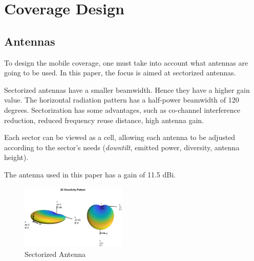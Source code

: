 \documentclass[letterpaper, 10 pt, conference]{ieeeconf}  %
\begin{document}
\section{Coverage Design}
\subsection{Antennas}\noindent
To design the mobile coverage, one must take into account what antennas are going to be used. In this paper, the focus is aimed at sectorized antennas.
\par\noindent
Sectorized antennas have a smaller beamwidth. Hence they have a higher gain value. The horizontal radiation pattern has a half-power beamwidth of 120 degrees. Sectorization has some advantages, such as co-channel interference reduction, reduced frequency reuse distance, high antenna gain. \par\noindent
Each sector can be viewed as a cell, allowing each antenna to be adjusted according to the sector's needs (\textit{downtilt}, emitted power, diversity, antenna height).\par\noindent
The antenna used in this paper has a gain of 11.5 dBi.
\begin{figure}[h]
    \centering
    \includegraphics[width=0.45\textwidth]{antenasectorizada.JPG}
    \caption{Sectorized Antenna}
    \label{fig:antenna3D}
\end{figure}
\FloatBarrier
\end{document}
